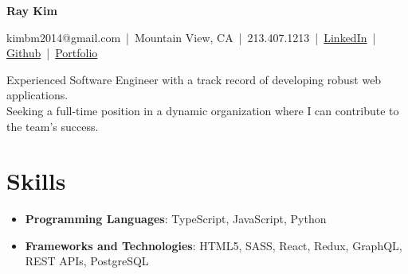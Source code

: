 \documentclass[a4paper,10pt]{article}
\begin{document}
\pagestyle{empty}

\begin{center}
    {\LARGE \textbf{Ray Kim}}
\end{center}
\noindent \begin{center}
    kimbm2014@gmail.com \,|\, Mountain View, CA \,|\, 213.407.1213 \,|\, \href{https://www.linkedin.com/in/ray-kim0727}{LinkedIn} \,|\, \href{https://github.com/moonnada}{Github} \,|\, \href{https://raykim0727.vercel.app/}{Portfolio}
\end{center}

\vspace{1.5mm}

\begin{center}
    Experienced Software Engineer with a track record of developing robust web applications.\\
    Seeking a full-time position in a dynamic organization where I can contribute to the team’s success.
\end{center}

\vspace{1.5mm}

\section*{Skills}\vspace{0.5mm}
\begin{itemize}
    \item \textbf{Programming Languages}: TypeScript, JavaScript, Python\vspace{0.5ex}
    \item \textbf{Frameworks and Technologies}: HTML5, SASS, React, Redux, GraphQL, REST APIs, PostgreSQL\vspace{0.5ex}    
\end{itemize}

\vspace{3mm}
\end{document}
